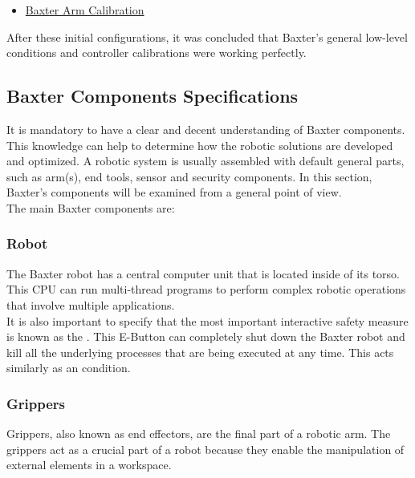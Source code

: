 \documentclass[11pt]{report} %
\begin{document}
\begin{itemize}
    \color{blue}
    \item \href{https://sdk.rethinkrobotics.com/wiki/Arm_Calibration}{Baxter Arm Calibration}
\end{itemize}

After these initial configurations, it was concluded that Baxter's general low-level conditions and controller calibrations were working perfectly.\\


\subsection{Baxter Components Specifications}

It is mandatory to have a clear and decent understanding of Baxter components. This knowledge can help to determine how the robotic solutions are developed and optimized. A robotic system is usually assembled with default general parts, such as arm(s), end tools, sensor and security components. In this section, Baxter's components will be examined from a general point of view.\\

The main Baxter components are:

\subsubsection{Robot}

The Baxter robot has a central computer unit that is located inside of its torso. This
CPU can run multi-thread programs to perform complex robotic operations that involve multiple applications.\\

It is also important to specify that the most important interactive safety measure is known as the . This E-Button can completely shut down the Baxter robot and kill all the underlying processes that are being executed at any time. This acts similarly as an  condition.\\


\subsubsection{Grippers}

Grippers, also known as end effectors, are the final part of a robotic arm. The grippers act as a crucial part of a robot because they enable the manipulation of external elements in a workspace.\\
\end{document}
